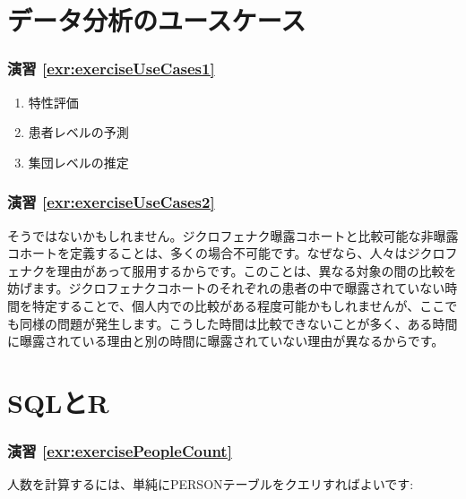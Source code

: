 \documentclass[
  11pt]{book}
\theoremstyle{definition}
\theoremstyle{definition}
\theoremstyle{definition}
\theoremstyle{definition}
\theoremstyle{remark}
\begin{document}
\section{データ分析のユースケース}\label{UseCasesanswers}

\subsubsection*{演習 \ref{exr:exerciseUseCases1}}\label{ux6f14ux7fd2-refexrexerciseusecases1}

\begin{enumerate}
\def\labelenumi{\arabic{enumi}.}
\item
  特性評価
\item
  患者レベルの予測
\item
  集団レベルの推定
\end{enumerate}

\subsubsection*{演習 \ref{exr:exerciseUseCases2}}\label{ux6f14ux7fd2-refexrexerciseusecases2}

そうではないかもしれません。ジクロフェナク曝露コホートと比較可能な非曝露コホートを定義することは、多くの場合不可能です。なぜなら、人々はジクロフェナクを理由があって服用するからです。このことは、異なる対象の間の比較を妨げます。ジクロフェナクコホートのそれぞれの患者の中で曝露されていない時間を特定することで、個人内での比較がある程度可能かもしれませんが、ここでも同様の問題が発生します。こうした時間は比較できないことが多く、ある時間に曝露されている理由と別の時間に曝露されていない理由が異なるからです。

\section{SQLとR}\label{SqlAndRanswers}

\subsubsection*{演習 \ref{exr:exercisePeopleCount}}\label{ux6f14ux7fd2-refexrexercisepeoplecount}

人数を計算するには、単純にPERSONテーブルをクエリすればよいです:
\end{document}
